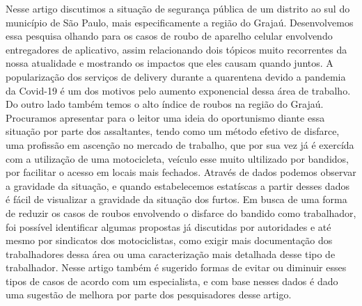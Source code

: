     Nesse artigo discutimos a situação de segurança pública de um 
    distrito ao sul do município de São Paulo, mais especificamente
    a região do Grajaú. Desenvolvemos essa pesquisa olhando para os 
    casos de roubo de aparelho celular envolvendo entregadores de 
    aplicativo, assim relacionando dois tópicos muito recorrentes
    da nossa atualidade e mostrando os impactos que eles causam
    quando juntos. A popularização dos serviços de delivery durante
    a quarentena devido a pandemia da Covid-19 é um dos motivos pelo
    aumento exponencial dessa área de trabalho. Do outro lado também 
    temos o alto índice de roubos na região do Grajaú. Procuramos 
    apresentar para o leitor uma ideia do oportunismo diante essa 
    situação por parte dos assaltantes, tendo como um método efetivo
    de disfarce, uma profissão em ascenção no mercado de trabalho, que
    por sua vez já é exercída com a utilização de uma motocicleta,
    veículo esse muito ultilizado por bandidos, por facilitar o 
    acesso em locais mais fechados. Através de dados podemos observar
    a gravidade da situação, e quando estabelecemos
    estatíscas a partir desses dados é fácil de visualizar a gravidade 
    da situação dos furtos. Em busca de uma forma de reduzir os casos
    de roubos envolvendo o disfarce do bandido como trabalhador, foi 
    possível identificar algumas propostas já discutidas por autoridades
    e até mesmo por sindicatos dos motociclistas, como exigir mais 
    documentação dos trabalhadores dessa área ou uma 
    caracterização mais detalhada desse tipo de trabalhador. Nesse artigo 
    também é sugerido formas de evitar ou diminuir esses tipos de casos
    de acordo com um especialista, e com base nesses dados é dado uma sugestão 
    de melhora por parte dos pesquisadores desse artigo.